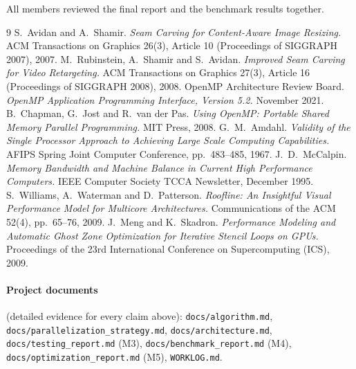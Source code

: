 \documentclass[11pt,a4paper]{article}
\begin{document}
All members reviewed the final report and the benchmark results together.

\begin{thebibliography}{9}
 S.~Avidan and A.~Shamir. \emph{Seam Carving for Content-Aware Image Resizing.} ACM
  Transactions on Graphics 26(3), Article 10 (Proceedings of SIGGRAPH 2007), 2007.
 M.~Rubinstein, A.~Shamir and S.~Avidan. \emph{Improved Seam Carving for Video
  Retargeting.} ACM Transactions on Graphics 27(3), Article 16 (Proceedings of SIGGRAPH 2008), 2008.
 OpenMP Architecture Review Board. \emph{OpenMP Application Programming Interface,
  Version 5.2.} November 2021.
 B.~Chapman, G.~Jost and R.~van der Pas. \emph{Using OpenMP: Portable Shared Memory
  Parallel Programming.} MIT Press, 2008.
 G.~M.~Amdahl. \emph{Validity of the Single Processor Approach to Achieving Large Scale
  Computing Capabilities.} AFIPS Spring Joint Computer Conference, pp.~483--485, 1967.
 J.~D.~McCalpin. \emph{Memory Bandwidth and Machine Balance in Current High
  Performance Computers.} IEEE Computer Society TCCA Newsletter, December 1995.
 S.~Williams, A.~Waterman and D.~Patterson. \emph{Roofline: An Insightful Visual
  Performance Model for Multicore Architectures.} Communications of the ACM 52(4), pp.~65--76, 2009.
 J.~Meng and K.~Skadron. \emph{Performance Modeling and Automatic Ghost Zone Optimization
  for Iterative Stencil Loops on GPUs.} Proceedings of the 23rd International Conference on
  Supercomputing (ICS), 2009.
\end{thebibliography}

\paragraph{Project documents} (detailed evidence for every claim above): \texttt{docs/algorithm.md},
\texttt{docs/parallelization\_strategy.md}, \texttt{docs/architecture.md}, \texttt{docs/testing\_report.md}
(M3), \texttt{docs/benchmark\_report.md} (M4), \texttt{docs/optimization\_report.md} (M5),
\texttt{WORKLOG.md}.
\end{document}
